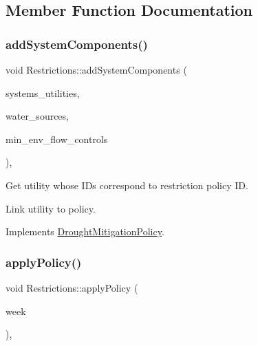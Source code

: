 \subsection{Member Function Documentation}
\mbox{\label{classRestrictions_ab0a2b62495d6cdd8d1fedba419c05c37_ab0a2b62495d6cdd8d1fedba419c05c37}} 
\subsubsection{\texorpdfstring{add\+System\+Components()}{addSystemComponents()}}
{\footnotesize\ttfamily void Restrictions\+::add\+System\+Components (\begin{DoxyParamCaption}\item[{vector$<$ \mbox{\hyperlink{classUtility}{Utility}} $\ast$$>$}]{systems\+\_\+utilities,  }\item[{vector$<$ \mbox{\hyperlink{classWaterSource}{Water\+Source}} $\ast$$>$}]{water\+\_\+sources,  }\item[{vector$<$ \mbox{\hyperlink{classMinEnvFlowControl}{Min\+Env\+Flow\+Control}} $\ast$$>$}]{min\+\_\+env\+\_\+flow\+\_\+controls }\end{DoxyParamCaption})\hspace{0.3cm}{\ttfamily [override]}, {\ttfamily [virtual]}}

Get utility whose I\+Ds correspond to restriction policy ID.

Link utility to policy. 

Implements \mbox{\hyperlink{classDroughtMitigationPolicy_aaab042a79d781afe8e08753b7012372a_aaab042a79d781afe8e08753b7012372a}{Drought\+Mitigation\+Policy}}.

\mbox{\label{classRestrictions_a1ef7559adc034bdddd047ee776b5f9a9_a1ef7559adc034bdddd047ee776b5f9a9}} 
\subsubsection{\texorpdfstring{apply\+Policy()}{applyPolicy()}}
{\footnotesize\ttfamily void Restrictions\+::apply\+Policy (\begin{DoxyParamCaption}\item[{int}]{week }\end{DoxyParamCaption})\hspace{0.3cm}{\ttfamily [override]}, {\ttfamily [virtual]}}

